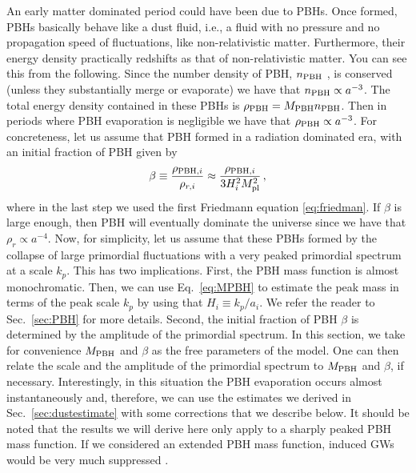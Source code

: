 \documentclass[a4paper,11pt]{article}
\numberwithin{equation}{section}
\begin{document}
An early matter dominated period could have been due to PBHs. Once formed, PBHs basically behave like a dust fluid, i.e., a fluid with no pressure and no propagation speed of fluctuations, like non-relativistic matter. Furthermore, their energy density practically redshifts as that of non-relativistic matter. You can see this from the following. Since the number density of PBH, $n_{\rm PBH}$ , is conserved (unless they substantially merge or evaporate) we have that $n_{\rm PBH}\propto a^{-3}$. The total energy density contained in these PBHs is $\rho_{\rm PBH}=M_{\rm PBH} n_{\rm PBH}$. Then in periods where PBH evaporation is negligible we have that $\rho_{\rm PBH}\propto a^{-3}$. For concreteness, let us assume that PBH formed in a radiation dominated era, with an initial fraction of PBH given by
\begin{align}
\beta\equiv\frac{\rho_{{\rm PBH},i}}{\rho_{r,i}}\approx \frac{\rho_{{\rm PBH},i}}{3H_i^2M^2_{\rm pl}}\,,
\end{align}
where in the last step we used the first Friedmann equation \eqref{eq:friedman}. If $\beta$ is large enough, then PBH will eventually dominate the universe since we have that $\rho_r\propto a^{-4}$. Now, for simplicity, let us assume that these PBHs formed by the collapse of large primordial fluctuations with a very peaked primordial spectrum at a scale $k_p$. This has two implications. First, the PBH mass function is almost monochromatic. Then, we can use Eq.~\eqref{eq:MPBH} to estimate the peak mass in terms of the peak scale $k_p$ by using that $H_i\equiv k_p/a_{i}$. We refer the reader to Sec.~\ref{sec:PBH} for more details. Second, the initial fraction of PBH $\beta$ is determined by the amplitude of the primordial spectrum. In this section, we take for convenience $M_{\rm PBH}$ and $\beta$ as the free parameters of the model. One can then relate the scale and the amplitude of the primordial spectrum to $M_{\rm PBH}$ and $\beta$, if necessary. Interestingly, in this situation the PBH evaporation occurs almost instantaneously \cite{Inomata:2020lmk} and, therefore, we can use the estimates we derived in Sec.~\ref{sec:dustestimate} with some corrections that we describe below. It should be noted that the results we will derive here only apply to a sharply peaked PBH mass function. If we considered an extended PBH mass function, induced GWs would be very much suppressed \cite{Inomata:2020lmk}.
\end{document}
